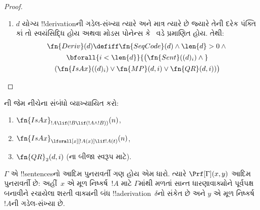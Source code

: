 \documentclass[../../../include/open-logic-section]{subfiles}
\begin{document}
\begin{proof}
\begin{enumerate}
  \QR{}નું બીજું સ્વરૂપ અભ્યાસપ્રશ્ન
  તરીકે મૂકીએ છીએ.
\item $d$ યોગ્ય !!{derivation}ની
  ગડેલ-સંખ્યા ત્યારે અને માત્ર ત્યારે
  છે જ્યારે તેની દરેક પંક્તિ કાં તો
  સ્વયંસિદ્ધિ હોય અથવા મોડસ પોનેન્સ
  કે~\QR{} વડે પ્રમાણિત હોય. તેથી:
  \begin{multline*}
  \fn{Deriv}(d) \defiff \fn{SeqCode}(d) \land \len{d}>0 \land {}\\
  \bforall{i < \len{d}}{\bigl(\fn{Sent}((d)_i) \land {}}\\
  (\fn{IsAx}((d)_i) \lor
    \fn{MP}(d,i) \lor \fn{QR}(d, i))\bigr)
  \end{multline*}
\end{enumerate}
\end{proof}

\begin{prob}
ની
જેમ નીચેના સંબંધો વ્યાખ્યાયિત કરો:
\begin{enumerate}
\item $\fn{IsAx}_{!A \lif (!B \lif (!A \land !B))}(n)$,
\item $\fn{IsAx}_{\lforall[x][!A(x)] \lif !A(t)}(n)$,
\item $\fn{QR}_{2}(d, i)$
  (\QR{}ના બીજા સ્વરૂપ માટે).
\end{enumerate}
\end{prob}

\begin{prop}
$\Gamma$ એ !!{sentence}sનો આદિમ
પુનરાવર્તી ગણ હોય એમ ધારો.
ત્યારે $\Prf[\Gamma](x, y)$ આદિમ
પુનરાવર્તી છે: અહીં~$x$ એ
મૂળ નિષ્કર્ષ~$!A$ માટે
$\Gamma$માંથી મળતાં સાન્ત
ધારણાવાક્યોને પૂર્વપક્ષ બનાવીને
રચાયેલા શરતી વાક્યની બંધ
!!a{derivation}~$\delta$નો સંકેત છે
અને $y$ એ મૂળ નિષ્કર્ષ~$!A$ની
ગડેલ-સંખ્યા છે.
\end{prop}
\end{document}
